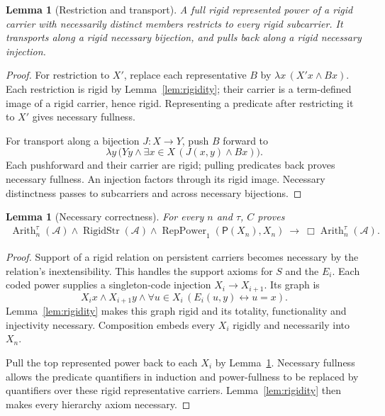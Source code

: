 \documentclass[11pt,letterpaper,numbers=noenddot]{scrartcl}
\numberwithin{equation}{section}
\newtheorem{lemma}[theorem]{Lemma}
\theoremstyle{definition}
\newcommand{\RigidStr}{\operatorname{RigidStr}}
\newcommand{\Rep}{\operatorname{RepPower}_1}
\newcommand{\Arith}{\operatorname{Arith}}
\newcommand{\PP}{\mathsf P}
\begin{document}
\begin{lemma}[Restriction and transport]\label{lem:transport}
A full rigid represented power of a rigid carrier with necessarily distinct members restricts to every rigid subcarrier. It transports along a rigid necessary bijection, and pulls back along a rigid necessary injection.
\end{lemma}

\begin{proof}
For restriction to $X'$, replace each representative $B$ by
$\lambda x\,(X'x\land Bx)$. Each restriction is rigid by Lemma~\ref{lem:rigidity}; their carrier is a term-defined image of a rigid carrier, hence rigid. Representing a predicate after restricting it to $X'$ gives necessary fullness.

For transport along a bijection $J:X\to Y$, push $B$ forward to
\[
\lambda y\,\bigl(Yy\land\exists x\in X\,(J(x,y)\land Bx)\bigr).
\]
Each pushforward and their carrier are rigid; pulling predicates back proves necessary fullness. An injection factors through its rigid image. Necessary distinctness passes to subcarriers and across necessary bijections.
\end{proof}

\begin{lemma}[Necessary correctness]\label{lem:necessary}
For every $n$ and $\tau$, $C$ proves
\begin{equation}\label{eq:necessary}
\begin{split}
\Arith_n^\tau(\mathcal A)\land\RigidStr(\mathcal A)
\land\Rep(\PP(X_n),X_n)
\ \longrightarrow\
\Box\Arith_n^\tau(\mathcal A).
\end{split}
\end{equation}
\end{lemma}

\begin{proof}
Support of a rigid relation on persistent carriers becomes necessary by the relation's inextensibility. This handles the support axioms for $S$ and the $E_i$. Each coded power supplies a singleton-code injection $X_i\to X_{i+1}$. Its graph is
\[
X_i x\land X_{i+1}y\land
\forall u\in X_i\,(E_i(u,y)\leftrightarrow u=x).
\]
Lemma~\ref{lem:rigidity} makes this graph rigid and its totality, functionality and injectivity necessary. Composition embeds every $X_i$ rigidly and necessarily into $X_n$.

Pull the top represented power back to each $X_i$ by Lemma~\ref{lem:transport}. Necessary fullness allows the predicate quantifiers in induction and power-fullness to be replaced by quantifiers over these rigid representative carriers. Lemma~\ref{lem:rigidity} then makes every hierarchy axiom necessary.
\end{proof}
\end{document}
